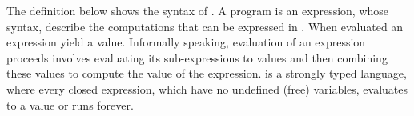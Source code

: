 \begin{cluster}
\label{grp:grm:sparc::shows}

\begin{gram}
\label{grm:sparc::shows}
The definition below shows the syntax of \pml{}.
A \pml{} program is an expression, whose syntax,
 describe the computations that can be expressed in \pml{}.
When evaluated an expression yield a value.
Informally speaking, evaluation of an expression proceeds involves
evaluating its sub-expressions to values and then combining these
values  to compute the value of the expression.
\pml{} is a strongly typed language, where every closed expression,
which have no undefined (free) variables, evaluates to a value or runs
forever.

\end{gram}
\end{cluster}

